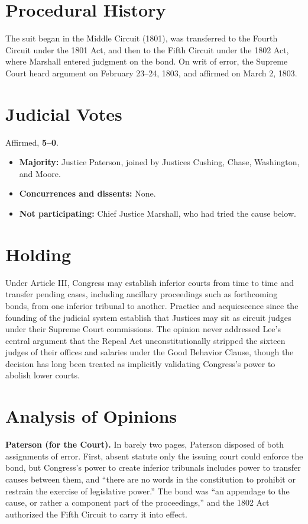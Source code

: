 \documentclass[12pt]{article}
\begin{document}
\section{Procedural History}

The suit began in the Middle Circuit (1801), was transferred to the Fourth Circuit under the 1801 Act, and then to the Fifth Circuit under the 1802 Act, where Marshall entered judgment on the bond. On writ of error, the Supreme Court heard argument on February 23--24, 1803, and affirmed on March 2, 1803.

\section{Judicial Votes}

Affirmed, \textbf{5--0}.
\begin{itemize}
\item \textbf{Majority:} Justice Paterson, joined by Justices Cushing, Chase, Washington, and Moore.
\item \textbf{Concurrences and dissents:} None.
\item \textbf{Not participating:} Chief Justice Marshall, who had tried the cause below.
\end{itemize}

\section{Holding}

Under Article III, Congress may establish inferior courts from time to time and transfer pending cases, including ancillary proceedings such as forthcoming bonds, from one inferior tribunal to another. Practice and acquiescence since the founding of the judicial system establish that Justices may sit as circuit judges under their Supreme Court commissions. The opinion never addressed Lee's central argument that the Repeal Act unconstitutionally stripped the sixteen judges of their offices and salaries under the Good Behavior Clause, though the decision has long been treated as implicitly validating Congress's power to abolish lower courts.

\section{Analysis of Opinions}

\textbf{Paterson (for the Court).} In barely two pages, Paterson disposed of both assignments of error. First, absent statute only the issuing court could enforce the bond, but Congress's power to create inferior tribunals includes power to transfer causes between them, and ``there are no words in the constitution to prohibit or restrain the exercise of legislative power.'' The bond was ``an appendage to the cause, or rather a component part of the proceedings,'' and the 1802 Act authorized the Fifth Circuit to carry it into effect.
\end{document}
